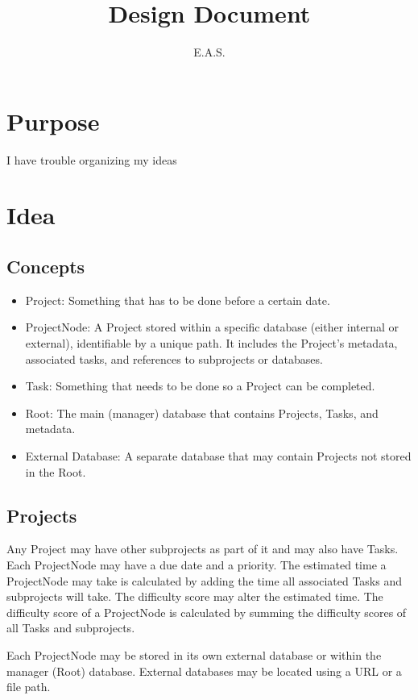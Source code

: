 \documentclass{article}
\title{Design Document}
\author{E.A.S.}
\begin{document}
\maketitle
\newpage


\section{Purpose}
I have trouble organizing my ideas

\section{Idea}
\subsection{Concepts}
\begin{itemize}
    \item Project: Something that has to be done before a certain date.
    \item ProjectNode: A Project stored within a specific database (either internal or external), identifiable by a unique path. It includes the Project's metadata, associated tasks, and references to subprojects or databases.
    \item Task: Something that needs to be done so a Project can be completed.
    \item Root: The main (manager) database that contains Projects, Tasks, and metadata.
    \item External Database: A separate database that may contain Projects not stored in the Root.
\end{itemize}

\subsection{Projects}
Any Project may have other subprojects as part of it and may also have Tasks. Each ProjectNode may have a due date and a priority.
The estimated time a ProjectNode may take is calculated by adding the time all associated Tasks and subprojects will take. The difficulty score may alter the estimated time.
The difficulty score of a ProjectNode is calculated by summing the difficulty scores of all Tasks and subprojects.

Each ProjectNode may be stored in its own external database or within the manager (Root) database. External databases may be located using a URL or a file path.
\end{document}
